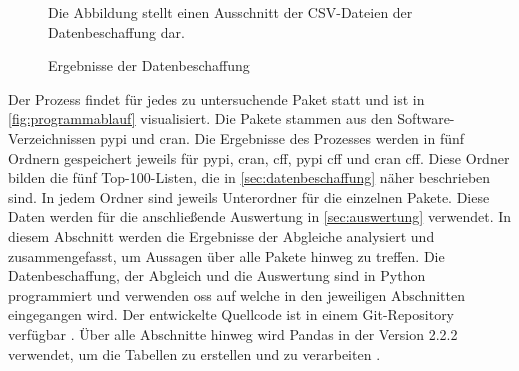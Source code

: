 \begin{figure}
    \caption{Ergebnisse der Datenbeschaffung}
    \label{fig:datenbeschaffung_ergebnisse}
    \small
    Die Abbildung stellt einen Ausschnitt der CSV-Dateien der Datenbeschaffung dar.
\end{figure}

Der Prozess findet für jedes zu untersuchende Paket statt und ist in \autoref{fig:programmablauf} visualisiert.
Die Pakete stammen aus den Software-Verzeichnissen \gls{pypi} und \gls{cran}.
Die Ergebnisse des Prozesses werden in fünf Ordnern gespeichert jeweils für \gls{pypi}, \gls{cran}, \gls{cff}, \gls{pypi} \gls{cff} und \gls{cran} \gls{cff}.
Diese Ordner bilden die fünf Top-100-Listen, die in \autoref{sec:datenbeschaffung} näher beschrieben sind.
In jedem Ordner sind jeweils Unterordner für die einzelnen Pakete.
Diese Daten werden für die anschließende Auswertung in \autoref{sec:auswertung} verwendet.
In diesem Abschnitt werden die Ergebnisse der Abgleiche analysiert und zusammengefasst, um Aussagen über alle Pakete hinweg zu treffen.
Die Datenbeschaffung, der Abgleich und die Auswertung sind in Python programmiert und verwenden \gls{oss} auf welche in den jeweiligen Abschnitten eingegangen wird.
Der entwickelte Quellcode ist in einem Git-Repository verfügbar \autocite{jahrens_t20240710-softwareauthors-kj_2025}.
Über alle Abschnitte hinweg wird Pandas in der Version 2.2.2 verwendet, um die Tabellen zu erstellen und zu verarbeiten \autocite{the_pandas_development_team_pandas_2024}.

